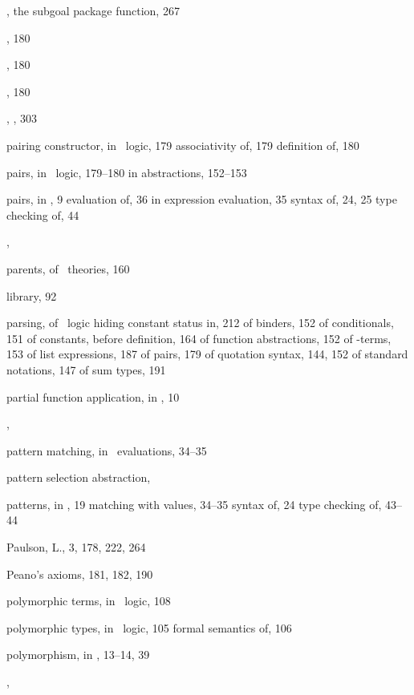 \begin{theindex}
  \item {}, the subgoal package function, 267
  \item {}, 180
  \item {}, 180
  \item {}, 180
  \item {}, , 303
  \item pairing constructor, in \HOL\ logic, 179
    \subitem associativity of, 179
    \subitem definition of, 180
  \item pairs, in \HOL\ logic, 179--180
    \subitem in abstractions, 152--153
  \item pairs, in \ML, 9
    \subitem evaluation of, 36
    \subitem in expression evaluation, 35
    \subitem syntax of, 24, 25
    \subitem type checking of, 44
  \item {}, 
  \item parents, of \HOL\ theories, 160
  \item {} library, 92
  \item parsing, of \HOL\ logic
    \subitem hiding constant status in, 212
    \subitem of binders, 152
    \subitem of conditionals, 151
    \subitem of constants, before definition, 164
    \subitem of function abstractions, 152
    \subitem of -terms, 153
    \subitem of list expressions, 187
    \subitem of pairs, 179
    \subitem of quotation syntax, 144, 152
    \subitem of standard notations, 147
    \subitem of sum types, 191
  \item partial function application, in \ML, 10
  \item {}, 
  \item pattern matching, in \ML\ evaluations, 34--35
  \item pattern selection abstraction, 
  \item patterns, in \ML, 19
    \subitem matching with values, 34--35
    \subitem syntax of, 24
    \subitem type checking of, 43--44
  \item Paulson, L., 3, 178, 222, 264
  \item Peano's axioms, 181, 182, 190
  \item polymorphic terms, in \HOL\ logic, 108
  \item polymorphic types, in \HOL\ logic, 105
    \subitem formal semantics of, 106
  \item polymorphism, in \ML, 13--14, 39
  \item {}, 

\end{theindex}
